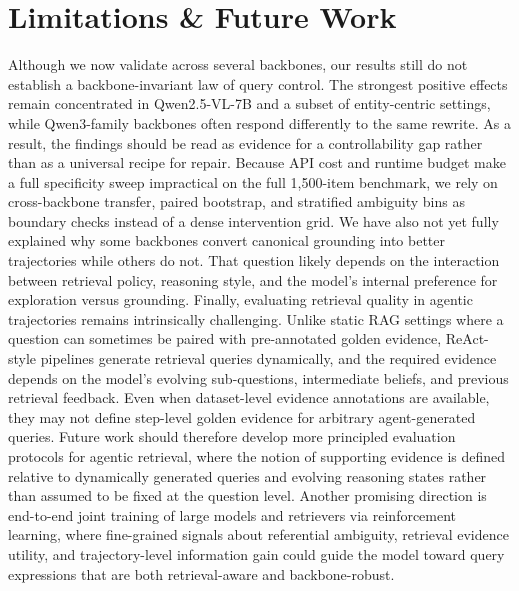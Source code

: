 \documentclass{article} %
\begin{document}
\section{Limitations \& Future Work}
Although we now validate across several backbones, our results still do not establish a backbone-invariant law of query control.
The strongest positive effects remain concentrated in Qwen2.5-VL-7B and a subset of entity-centric settings, while Qwen3-family backbones often respond differently to the same rewrite.
As a result, the findings should be read as evidence for a controllability gap rather than as a universal recipe for repair.
Because API cost and runtime budget make a full specificity sweep impractical on the full 1,500-item benchmark, we rely on cross-backbone transfer, paired bootstrap, and stratified ambiguity bins as boundary checks instead of a dense intervention grid.
We have also not yet fully explained why some backbones convert canonical grounding into better trajectories while others do not.
That question likely depends on the interaction between retrieval policy, reasoning style, and the model's internal preference for exploration versus grounding.
Finally, evaluating retrieval quality in agentic trajectories remains intrinsically challenging.
Unlike static RAG settings where a question can sometimes be paired with pre-annotated golden evidence, ReAct-style pipelines generate retrieval queries dynamically, and the required evidence depends on the model's evolving sub-questions, intermediate beliefs, and previous retrieval feedback.
Even when dataset-level evidence annotations are available, they may not define step-level golden evidence for arbitrary agent-generated queries.
Future work should therefore develop more principled evaluation protocols for agentic retrieval, where the notion of supporting evidence is defined relative to dynamically generated queries and evolving reasoning states rather than assumed to be fixed at the question level.
Another promising direction is end-to-end joint training of large models and retrievers via reinforcement learning, where fine-grained signals about referential ambiguity, retrieval evidence utility, and trajectory-level information gain could guide the model toward query expressions that are both retrieval-aware and backbone-robust.
\end{document}
